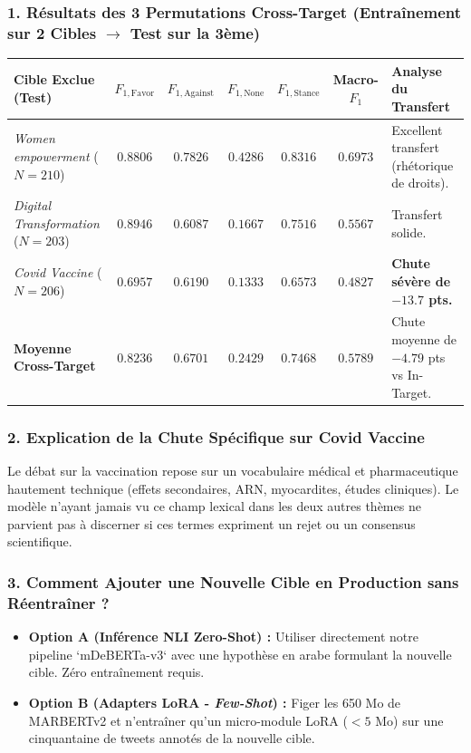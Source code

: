 \documentclass[11pt,a4paper]{article}
\begin{document}
\subsubsection*{1. Résultats des 3 Permutations Cross-Target (Entraînement sur 2 Cibles $\to$ Test sur la 3ème)}
\begin{table}[htbp]
\centering
\small
\begin{tabularx}{\textwidth}{lcccccX}
\toprule
\textbf{Cible Exclue (Test)} & \textbf{$F_{1,\text{Favor}}$} & \textbf{$F_{1,\text{Against}}$} & \textbf{$F_{1,\text{None}}$} & \textbf{$F_{1,\text{Stance}}$} & \textbf{Macro-$F_1$} & \textbf{Analyse du Transfert} \\
\midrule
\textit{Women empowerment} ($N=210$) & $0.8806$ & $0.7826$ & $0.4286$ & $\mathbf{0.8316}$ & $0.6973$ & Excellent transfert (rhétorique de droits). \\
\textit{Digital Transformation} ($N=203$) & $0.8946$ & $0.6087$ & $0.1667$ & $\mathbf{0.7516}$ & $0.5567$ & Transfert solide. \\
\textit{Covid Vaccine} ($N=206$) & $0.6957$ & $0.6190$ & $0.1333$ & $\mathbf{0.6573}$ & $0.4827$ & \textbf{Chute sévère de $-13.7$ pts.} \\
\midrule
\textbf{Moyenne Cross-Target} & $\mathbf{0.8236}$ & $\mathbf{0.6701}$ & $\mathbf{0.2429}$ & $\mathbf{0.7468}$ & $\mathbf{0.5789}$ & Chute moyenne de $-4.79$ pts vs In-Target. \\
\bottomrule
\end{tabularx}
\end{table}

\subsubsection*{2. Explication de la Chute Spécifique sur Covid Vaccine}
Le débat sur la vaccination repose sur un vocabulaire médical et pharmaceutique hautement technique (effets secondaires, ARN, myocardites, études cliniques). Le modèle n'ayant jamais vu ce champ lexical dans les deux autres thèmes ne parvient pas à discerner si ces termes expriment un rejet ou un consensus scientifique.

\subsubsection*{3. Comment Ajouter une Nouvelle Cible en Production sans Réentraîner ?}
\begin{itemize}[noitemsep]
    \item \textbf{Option A (Inférence NLI Zero-Shot) :} Utiliser directement notre pipeline `mDeBERTa-v3` avec une hypothèse en arabe formulant la nouvelle cible. Zéro entraînement requis.
    \item \textbf{Option B (Adapters LoRA - \textit{Few-Shot}) :} Figer les 650 Mo de MARBERTv2 et n'entraîner qu'un micro-module LoRA ($< 5$ Mo) sur une cinquantaine de tweets annotés de la nouvelle cible.
\end{itemize}
\end{document}
